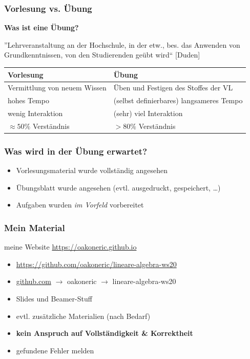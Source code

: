 \documentclass{beamer}
\begin{document}
	\begin{frame} \frametitle{Vorlesung vs. Übung}
		\centering
		\textbf{Was ist eine Übung?}
		
		''Lehrveranstaltung an der Hochschule, in der etw., bes. das Anwenden von Grundkenntnissen, von den Studierenden geübt wird`` [Duden]
		
		\pause
		
		\begin{tabularx}{\linewidth}{X|X}
			\hline
			\textbf{Vorlesung} & \textbf{Übung} \\ \hline \hline
			Vermittlung von neuem Wissen & Üben und Festigen des Stoffes der VL \\ \hline
			hohes Tempo & (selbst definierbares) langsameres Tempo \\ \hline
			wenig Interaktion & (sehr) viel Interaktion \\ \hline
			$\approx 50\%$ Verständnis & $>80\%$ Verständnis \\
			\hline
		\end{tabularx}
	\end{frame}

	\begin{frame} \frametitle{Was wird in der Übung erwartet?}
		\begin{itemize}
			\item Vorlesungsmaterial wurde vollständig angesehen
			\item Übungsblatt wurde angesehen (evtl. ausgedruckt, gespeichert, \dots)
			\item Aufgaben wurden \textit{im Vorfeld} vorbereitet
		\end{itemize}
	\end{frame}

	\begin{frame} \frametitle{Mein Material}
		
		\begin{block}{meine Website}
			\url{https://oakoneric.github.io}
		\end{block}
	
		\begin{itemize}[leftmargin=*]
			\item \url{https://github.com/oakoneric/lineare-algebra-ws20}
			\item \url{github.com} $\to$ oakoneric $\to$ lineare-algebra-ws20
			\medskip
			\item Slides und Beamer-Stuff
			\item evtl. zusätzliche Materialien (nach Bedarf)
			\item \alert{\textbf{kein Anspruch auf Vollständigkeit \& Korrektheit}}
			\item gefundene Fehler melden 
		\end{itemize}
	\end{frame}
\end{document}
